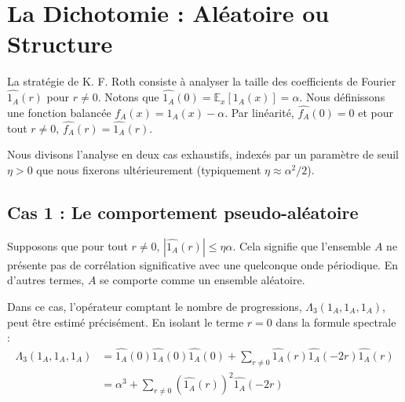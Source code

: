 \documentclass[12pt, a4paper]{article}
\begin{document}
\section{La Dichotomie : Aléatoire ou Structure}

La stratégie de K. F. Roth consiste à analyser la taille des coefficients de Fourier $\widehat{1_A}(r)$ pour $r \neq 0$. Notons que $\widehat{1_A}(0) = \mathbb{E}_{x}[1_A(x)] = \alpha$.
Nous définissons une fonction balancée $f_A(x) = 1_A(x) - \alpha$. Par linéarité, $\widehat{f_A}(0) = 0$ et pour tout $r \neq 0$, $\widehat{f_A}(r) = \widehat{1_A}(r)$.

Nous divisons l'analyse en deux cas exhaustifs, indexés par un paramètre de seuil $\eta > 0$ que nous fixerons ultérieurement (typiquement $\eta \approx \alpha^2 / 2$).

\subsection{Cas 1 : Le comportement pseudo-aléatoire}

Supposons que pour tout $r \neq 0$, $|\widehat{1_A}(r)| \leq \eta \alpha$. Cela signifie que l'ensemble $A$ ne présente pas de corrélation significative avec une quelconque onde périodique. En d'autres termes, $A$ se comporte comme un ensemble aléatoire.

Dans ce cas, l'opérateur comptant le nombre de progressions, $\Lambda_3(1_A, 1_A, 1_A)$, peut être estimé précisément. En isolant le terme $r=0$ dans la formule spectrale :
\begin{align}
\Lambda_3(1_A, 1_A, 1_A) &= \widehat{1_A}(0) \widehat{1_A}(0) \widehat{1_A}(0) + \sum_{r \neq 0} \widehat{1_A}(r) \widehat{1_A}(-2r) \widehat{1_A}(r) \\
&= \alpha^3 + \sum_{r \neq 0} (\widehat{1_A}(r))^2 \widehat{1_A}(-2r)
\end{align}
\end{document}
